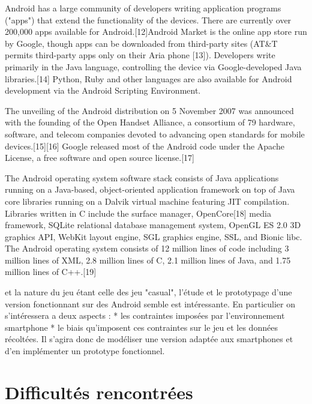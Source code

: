 \documentclass[a4paper,11pt,french]{article}
\begin{document}
Android has a large community of developers writing application programs ("apps") that extend the functionality of the devices. There are currently over 200,000 apps available for Android.[12]Android Market is the online app store run by Google, though apps can be downloaded from third-party sites (AT&T permits third-party apps only on their Aria phone [13]). Developers write primarily in the Java language, controlling the device via Google-developed Java libraries.[14] Python, Ruby and other languages are also available for Android development via the Android Scripting Environment.

The unveiling of the Android distribution on 5 November 2007 was announced with the founding of the Open Handset Alliance, a consortium of 79 hardware, software, and telecom companies devoted to advancing open standards for mobile devices.[15][16] Google released most of the Android code under the Apache License, a free software and open source license.[17]

The Android operating system software stack consists of Java applications running on a Java-based, object-oriented application framework on top of Java core libraries running on a Dalvik virtual machine featuring JIT compilation. Libraries written in C include the surface manager, OpenCore[18] media framework, SQLite relational database management system, OpenGL ES 2.0 3D graphics API, WebKit layout engine, SGL graphics engine, SSL, and Bionic libc. The Android operating system consists of 12 million lines of code including 3 million lines of XML, 2.8 million lines of C, 2.1 million lines of Java, and 1.75 million lines of C++.[19]













 et la nature du jeu étant celle des jeu "casual", l'étude et le prototypage d'une version fonctionnant sur des Android semble est intéressante. En particulier on s'intéressera a deux aspects : * les contraintes imposées par l'environnement smartphone * le biais qu'imposent ces contraintes sur le jeu et les données récoltées. Il s'agira donc de modéliser une version adaptée aux smartphones et d'en implémenter un prototype fonctionnel.  


\section{Difficultés rencontrées}
\end{document}
